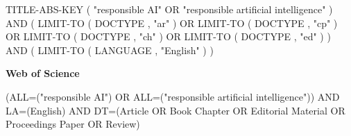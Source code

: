 \begin{verbatimBreakable}
TITLE-ABS-KEY ( "responsible AI" OR "responsible artificial intelligence" )
AND (
LIMIT-TO ( DOCTYPE , "ar" )
OR LIMIT-TO ( DOCTYPE , "cp" )
OR LIMIT-TO ( DOCTYPE , "ch" )
OR LIMIT-TO ( DOCTYPE , "ed" )
)
AND (
LIMIT-TO ( LANGUAGE , "English" )
)
\end{verbatimBreakable}

\textbf{Web of Science}
\begin{verbatimBreakable}
(ALL=("responsible AI") OR ALL=("responsible artificial intelligence")) AND LA=(English) AND DT=(Article OR Book Chapter OR Editorial Material OR Proceedings Paper OR Review)
\end{verbatimBreakable}
